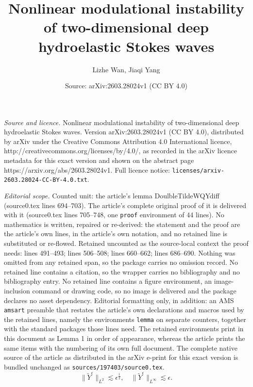 \documentclass[10pt,a4paper]{amsart}
\title{Nonlinear modulational instability of two-dimensional deep hydroelastic Stokes waves}
\author{Lizhe Wan, Jiaqi Yang}
\date{Source: arXiv:2603.28024v1 (CC BY 4.0)}
\newcommand{\f}{\frac}
\begin{document}
\maketitle

\noindent\emph{Source and licence.} Nonlinear modulational instability of two-dimensional deep hydroelastic Stokes waves. Version arXiv:2603.28024v1 (CC BY 4.0), distributed by arXiv under the Creative Commons Attribution 4.0 International licence, http://creativecommons.org/licenses/by/4.0/, as recorded in the arXiv licence metadata for this exact version and shown on the abstract page https://arxiv.org/abs/2603.28024v1. Full licence notice: \texttt{licenses/arxiv-2603.28024-CC-BY-4.0.txt}.\par\smallskip

\noindent\textit{Editorial scope.} Counted unit: the article's lemma DoulbleTildeWQYdiff (source0.tex lines 694--703). The article's complete original proof of it is delivered with it (source0.tex lines 705--748, one \texttt{proof} environment of 44 lines). No mathematics is written, repaired or re-derived: the statement and the proof are the article's own lines, in the article's own notation, and no retained line is substituted or re-flowed.  Retained uncounted as the source-local context the proof needs: lines 491--493; lines 506--508; lines 660--662; lines 686--690.  Nothing was omitted from any retained span, so the package carries no omission record.  No retained line contains a citation, so the wrapper carries no bibliography and no bibliography entry.  No retained line contains a figure environment, an image-inclusion command or drawing code, so no image is delivered and the package declares no asset dependency.  Editorial formatting only, in addition: an AMS \texttt{amsart} preamble that restates the article's own declarations and macros used by the retained lines, namely the environments \texttt{lemma} on separate counters, together with the standard packages those lines need.  The retained environments print in this document as Lemma 1 in order of appearance, whereas the article prints the same items with the numbering of its own full document.  The complete native source of the article as distributed in the arXiv e-print for this exact version is bundled unchanged as \texttt{sources/197403/source0.tex}.
\begin{equation} \label{TildeYEpsilonBound}
\|\tilde{Y}^\epsilon \|_{L^2} \lesssim \epsilon^\f12, \quad \|\tilde{Y}^\epsilon \|_{L^\infty} \lesssim \epsilon.
\end{equation}
\end{document}
